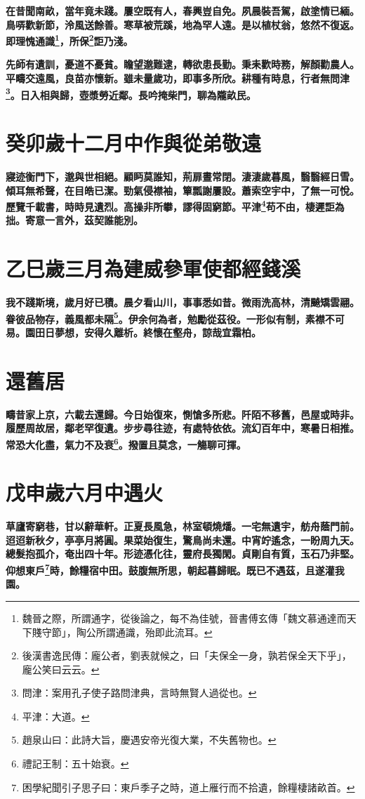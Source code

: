 \textbf{在昔聞南畝，當年竟未踐。屢空既有人，春興豈自免。夙晨裝吾駕，啟塗情已緬。鳥哢歡新節，泠風送餘善。寒草被荒蹊，地為罕人遠。是以植杖翁，悠然不復返。即理愧通識\footnote{魏晉之際，所謂通字，從後論之，每不為佳號，晉書傅玄傳「魏文慕通達而天下賤守節」，陶公所謂通識，殆即此流耳。}，所保\footnote{後漢書逸民傳：龐公者，劉表就候之，曰「夫保全一身，孰若保全天下乎」，龐公笑曰云云。}詎乃淺。}

\textbf{先師有遺訓，憂道不憂貧。瞻望邈難逮，轉欲患長勤。秉耒歡時務，解顏勸農人。平疇交遠風，良苗亦懷新。雖未量歲功，即事多所欣。耕種有時息，行者無問津\footnote{問津：案用孔子使子路問津典，言時無賢人過從也。}。日入相與歸，壺漿勞近鄰。長吟掩柴門，聊為隴畝民。}

\section{癸卯歲十二月中作與從弟敬遠}

\textbf{寢迹衡門下，邈與世相絕。顧眄莫誰知，荊扉晝常閉。淒淒歲暮風，翳翳經日雪。傾耳無希聲，在目皓已潔。勁氣侵襟袖，簞瓢謝屢設。蕭索空宇中，了無一可悅。歷覽千載書，時時見遺烈。高操非所攀，謬得固窮節。平津\footnote{平津：大道。}苟不由，棲遲詎為拙。寄意一言外，茲契誰能別。}

\section{乙巳歲三月為建威參軍使都經錢溪}

\textbf{我不踐斯境，歲月好已積。晨夕看山川，事事悉如昔。微雨洗高林，清飇矯雲翮。眷彼品物存，義風都未隔\footnote{趙泉山曰：此詩大旨，慶遇安帝光復大業，不失舊物也。}。伊余何為者，勉勵從茲役。一形似有制，素襟不可易。園田日夢想，安得久離析。終懷在壑舟，諒哉宜霜柏。}

\section{還舊居}

\textbf{疇昔家上京，六載去還歸。今日始復來，惻愴多所悲。阡陌不移舊，邑屋或時非。履歷周故居，鄰老罕復遺。步步尋往迹，有處特依依。流幻百年中，寒暑日相推。常恐大化盡，氣力不及衰\footnote{禮記王制：五十始衰。}。撥置且莫念，一觴聊可揮。}

\section{戊申歲六月中遇火}

\textbf{草廬寄窮巷，甘以辭華軒。正夏長風急，林室頓燒燔。一宅無遺宇，舫舟蔭門前。迢迢新秋夕，亭亭月將圓。果菜始復生，驚鳥尚未還。中宵竚遙念，一盼周九天。總髮抱孤介，奄出四十年。形迹憑化往，靈府長獨閑。貞剛自有質，玉石乃非堅。仰想東戶\footnote{困學紀聞引子思子曰：東戶季子之時，道上雁行而不拾遺，餘糧棲諸畝首。}時，餘糧宿中田。鼓腹無所思，朝起暮歸眠。既已不遇茲，且遂灌我園。}

